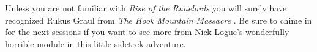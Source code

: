 Unless you are not familiar with {\itshape Rise of the Runelords} you will surely have recognized Rukus Graul from  {\itshape The Hook Mountain Massacre} . Be sure to chime in for the next sessions if you want to see more from Nick Logue's wonderfully horrible module in this little sidetrek adventure. 